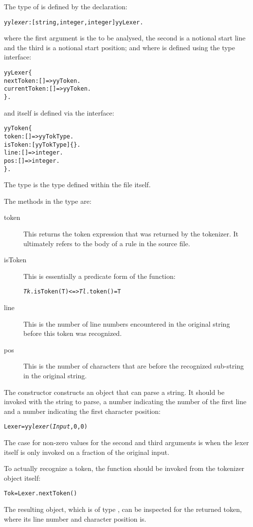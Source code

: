 The type of  is defined by the declaration:
\begin{alltt}
yy\emph{lexer}:[string,integer,integer]\sconarrow{}yyLexer.
\end{alltt}
where the first argument is the  to be analysed, the second is a notional start line and the third is a notional start position; and where  is defined using the type interface:
\begin{alltt}
yyLexer \impl \{ 
  nextToken:[]=>yyToken. 
  currentToken:[]=>yyToken. 
\}.
\end{alltt}
and  itself is defined via the interface:
\begin{alltt}
yyToken \impl \{ 
  token:[]=>yyTokType. 
  isToken:[yyTokType]\{\}. 
  line:[]=>integer. 
  pos:[]=>integer. 
\}.
\end{alltt}

The  type is the type defined within the  file itself.

The methods in the  type are:
\begin{description}
\item[token]
This returns the token expression that was returned by the tokenizer. It ultimately refers to the body of a rule in the \golex source file.

\item[isToken]
This is essentially a predicate form of the  function:
\begin{alltt}
\emph{Tk}.isToken(T) <=> \emph{Tl}.token()=T
\end{alltt}

\item[line]
This is the number of line numbers encountered in the original string before this token was recognized.

\item[pos]
This is the number of characters that are before the recognized sub-string in the original string.
\end{description}

The  constructor constructs an object that can parse a string. It should be invoked with the string to parse, a number indicating the number of the first line and a number indicating the first character position:
\begin{alltt}
Lexer = yy\emph{lexer}(\emph{Input},0,0)
\end{alltt}
\begin{aside}
The case for non-zero values for the second and third arguments is when the lexer itself is only invoked on a fraction of the original input.
\end{aside}
To actually recognize a token, the  function should be invoked from the tokenizer object itself:
\begin{alltt}
Tok = Lexer.nextToken()
\end{alltt}
The resulting object, which is of type , can be inspected for the returned token, where its line number and character position is.

